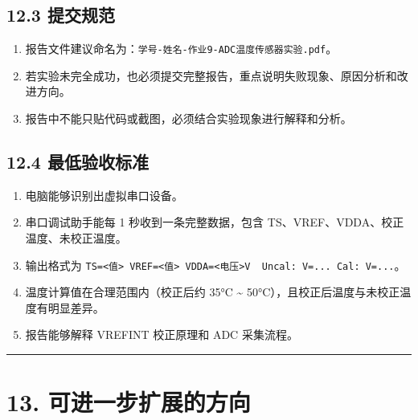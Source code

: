 \documentclass[
  chinese,
  UTF8,
  oneside,
  openany]{ctexbook}
\providecommand{\tightlist}{%
  \setlength{\itemsep}{0pt}\setlength{\parskip}{0pt}}
\begin{document}
\subsection{12.3 提交规范}\label{ux63d0ux4ea4ux89c4ux8303-4}

\begin{enumerate}
\def\labelenumi{\arabic{enumi}.}
\tightlist
\item
  报告文件建议命名为：\texttt{学号-姓名-作业9-ADC温度传感器实验.pdf}。
\item
  若实验未完全成功，也必须提交完整报告，重点说明失败现象、原因分析和改进方向。
\item
  报告中不能只贴代码或截图，必须结合实验现象进行解释和分析。
\end{enumerate}

\subsection{12.4
最低验收标准}\label{ux6700ux4f4eux9a8cux6536ux6807ux51c6-4}

\begin{enumerate}
\def\labelenumi{\arabic{enumi}.}
\tightlist
\item
  电脑能够识别出虚拟串口设备。
\item
  串口调试助手能每 1 秒收到一条完整数据，包含
  TS、VREF、VDDA、校正温度、未校正温度。
\item
  输出格式为
  \texttt{TS=\textless{}值\textgreater{}\ VREF=\textless{}值\textgreater{}\ VDDA=\textless{}电压\textgreater{}V\ \textbar{}\ Uncal:\ V=...\ Cal:\ V=...}。
\item
  温度计算值在合理范围内（校正后约 35°C \textasciitilde{}
  50°C），且校正后温度与未校正温度有明显差异。
\item
  报告能够解释 VREFINT 校正原理和 ADC 采集流程。
\end{enumerate}

\begin{center}\rule{0.5\linewidth}{0.5pt}\end{center}

\section{13.
可进一步扩展的方向}\label{ux53efux8fdbux4e00ux6b65ux6269ux5c55ux7684ux65b9ux5411-1}
\end{document}
